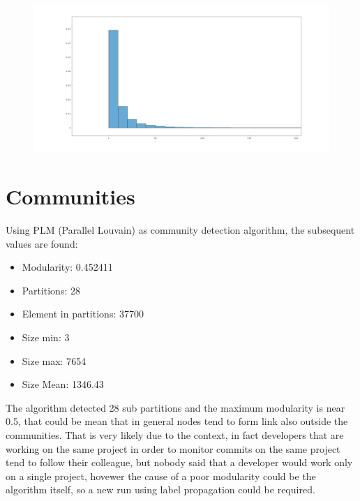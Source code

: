 \documentclass[]{article}
\begin{document}
    \begin{figure}[htp]
        \centering
        \includegraphics[scale=0.20]{./charts/degree_distribution.png}
    \end{figure}

    \section*{Communities}
    Using PLM (Parallel Louvain) as community detection algorithm, the subsequent values are found:
    \begin{itemize}
        \item Modularity: 0.452411
        \item Partitions: 28
        \item Element in partitions: 37700
        \item Size min: 3
        \item Size max: 7654
        \item Size Mean: 1346.43   
    \end{itemize}
    The algorithm detected 28 sub partitions and the maximum modularity is near 0.5, that could be mean that in general nodes tend to form link also outside the communities. That is very likely due to the context, in fact developers that are working on the same project in order to monitor commits on the same project tend to follow their colleague, but nobody said that a developer would work only on a single project, hovewer the cause of a poor modularity could be the algorithm itself, so a new run using label propagation could be required.
    
\end{document}
